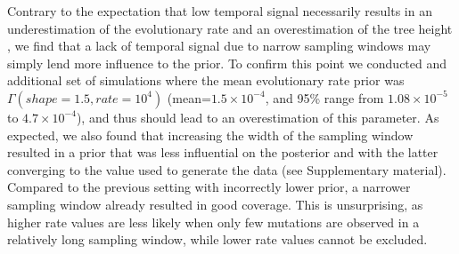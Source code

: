 \documentclass[11pt]{article}
\begin{document}
Contrary to the expectation that low temporal signal necessarily results in an underestimation of the evolutionary rate and an overestimation of the tree height \citep{duchene2015performance}, we find that a lack of temporal signal due to narrow sampling windows may simply lend more influence to the prior. To confirm this point we conducted and additional set of simulations where the mean evolutionary rate prior was $\Gamma(shape=1.5, rate=10^{4})$ (mean=$1.5\times 10^{-4}$, and 95\% range from $1.08 \times 10^{-5}$ to $4.7 \times 10^{-4}$), and thus should lead to an overestimation of this parameter. As expected, we also found that increasing the width of the sampling window resulted in a prior that was less influential on the posterior and with the latter converging to the value used to generate the data (see Supplementary material). Compared to the previous setting with incorrectly lower prior, a narrower sampling window already resulted in good coverage. This is unsurprising, as higher rate values are less likely when only few mutations are observed in a relatively long sampling window, while lower rate values cannot be excluded.
\end{document}
